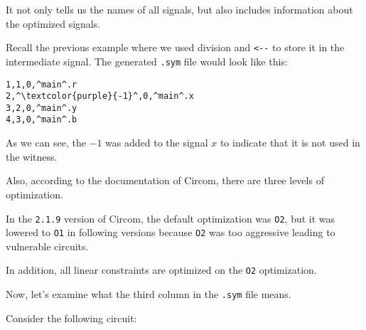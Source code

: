 \documentclass[../lecture-notes.tex]{subfiles}
\begin{document}
    It not only tells us the names of all signals, but also includes information about the optimized signals.

    Recall the previous example where we used division and \texttt{<-{-}} to store it in the intermediate signal.
    The generated \texttt{.sym} file would look like this:

    \begin{center}
        \begin{tcolorbox}[enhanced,
            width=0.5\textwidth,
            title=\textbf{.sym file for $b \;\texttt{<-{-}}\; x/y, r \;\texttt{<==}\; by$},
            coltitle=gray!25!black,
            attach boxed title to top center={yshift=-2mm,yshifttext=-1mm},
            boxed title style={size=small,colframe=gray!75!black,
            colback=blue!30!white,boxrule=1pt},
            top=-0.35cm,
            bottom=-0.35cm]
            \begin{lstlisting}[language=Circom,numbers=none,basicstyle=\ttfamily\footnotesize,escapechar=^]
1,1,0,^main^.r
2,^\textcolor{purple}{-1}^,0,^main^.x
3,2,0,^main^.y
4,3,0,^main^.b
            \end{lstlisting}
        \end{tcolorbox}
    \end{center}

    As we can see, the $-1$ was added to the signal $x$ to indicate that it is not used in the witness.

    Also, according to the documentation of Circom, there are three levels of optimization.

    In the \texttt{2.1.9} version of Circom, the default optimization was \texttt{O2}, but it was lowered to \texttt{O1} in following versions because \texttt{O2} was too aggressive leading to vulnerable circuits.

    \begin{remark}
        In addition, all linear constraints are optimized on the \texttt{O2} optimization.
    \end{remark}

    Now, let's examine what the third column in the \texttt{.sym} file means.

    Consider the following circuit:
\end{document}
